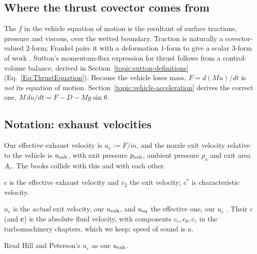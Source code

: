 \subsection{Where the thrust covector comes from}
The $f$ in the vehicle equation of motion is the resultant of surface
tractions, pressure and viscous, over the wetted boundary. Traction is
naturally a covector-valued $2$-form; Frankel pairs it with a deformation
$1$-form to give a scalar $3$-form of work
\cite[Section on Elasticity and Stresses]{frankel}. Sutton's
momentum-flux expression for thrust follows from a control-volume balance,
derived in Section~\ref{topic:sutton-definitions}
(Eq.~\ref{Eq:ThrustEquation}). Because the vehicle loses mass,
$F=d(Mu)/dt$ is \emph{not} its equation of motion.
Section~\ref{topic:vehicle-acceleration} derives the correct one,
$M\,du/dt=F-D-Mg\sin\theta$.

\subsection{Notation: exhaust velocities}
Our effective exhaust velocity is $u_e:=F/\dot m$, and the nozzle exit
velocity relative to the vehicle is $u_{\rm exh}$, with exit pressure
$p_{\rm exh}$, ambient pressure $p_a$ and exit area $A_e$. The books
collide with this and with each other.
\begin{description}\itemsep2pt
\item[Sutton] $c$ is the effective exhaust velocity \cite[Eq.~2--6]{sutton}
  and $v_2$ the exit velocity; $c^*$ is characteristic velocity.
\item[Hill and Peterson] $u_e$ is the \emph{actual} exit velocity, our
  $u_{\rm exh}$, and $u_{\rm eq}$ the effective one, our $u_e$
  \cite[Eq.~(10.5)]{hillpeterson}. Their $c$ (and $\mathbf c$) is the
  absolute fluid velocity, with components $c_r,c_\theta,c_z$ in the
  turbomachinery chapters, which we keep; speed of sound is $a$.
\end{description}
Read Hill and Peterson's $u_e$ as our $u_{\rm exh}$.

